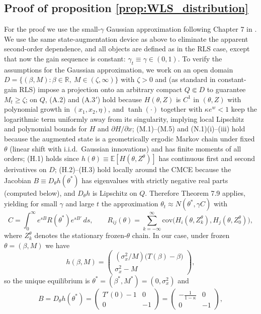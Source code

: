 \documentclass[11pt]{article}
\begin{document}
\subsection{Proof of proposition \ref{prop:WLS_distribution}}\label{app:proofs_WLS}
For the proof we use the small-$\gamma$ Gaussian approximation following Chapter 7 in \cite{GeorgeWEvans2001}.
We use the same state-augmentation device as above to eliminate the apparent second-order dependence, and all objects are defined as in the RLS case, except that now the gain sequence is constant: $\gamma_t\equiv \gamma\in(0,1)$.
To verify the assumptions for the Gaussian approximation, we work on an open domain $D=\{(\beta,M):\beta\in\mathbb R,\ M\in(\zeta,\infty)\}$ with $\zeta>0$ and (as standard in constant-gain RLS) impose a projection onto an arbitrary compact $Q\Subset D$ to guarantee $M_t\ge\zeta$; on $Q$, (A.2) and (A.3$'$) hold because $H(\theta,Z)$ is $C^1$ in $(\theta,Z)$ with polynomial growth in $(x_1,x_2,\eta)$, and $\tanh(\cdot)$ together with $\kappa e^{w}<1$ keep the logarithmic term uniformly away from its singularity, implying local Lipschitz and polynomial bounds for $H$ and $\partial H/\partial x$; (M.1)–(M.5) and (N.1)(i)–(iii) hold because the augmented state is a geometrically ergodic Markov chain under fixed $\theta$ (linear shift with i.i.d.\ Gaussian innovations) and has finite moments of all orders; (H.1) holds since $h(\theta)\equiv \mathbb E[H(\theta,Z^\theta)]$ has continuous first and second derivatives on $D$; (H.2)–(H.3) hold locally around the CMCE because the Jacobian $B\equiv D_\theta h(\theta^*)$ has eigenvalues with strictly negative real parts (computed below), and $D_\theta h$ is Lipschitz on $Q$. Therefore Theorem 7.9 applies, yielding for small $\gamma$ and large $t$ the approximation $\theta_t\approx N(\theta^*,\gamma C)$ with
\[
C=\int_0^\infty e^{sB}R(\theta^*)e^{sB'}\,ds,
\qquad
R_{ij}(\theta)=\sum_{k=-\infty}^{\infty}\mathrm{cov}\!\big(H_i(\theta,Z^\theta_k),H_j(\theta,Z^\theta_0)\big),
\]
where $Z_k^\theta$ denotes the stationary frozen-$\theta$ chain. 
In our case, under frozen $\theta=(\beta,M)$ we have
\[
h(\beta,M)=
\begin{pmatrix}
(\sigma_x^2/M)\big(T(\beta)-\beta\big)\\
\sigma_x^2-M
\end{pmatrix},
\]
so the unique equilibrium is $\theta^*=(\beta^*,M^*)=(0,\sigma_x^2)$ and
\[
B=D_\theta h(\theta^*)=
\begin{pmatrix}
T'(0)-1 & 0\\
0 & -1
\end{pmatrix}
=
\begin{pmatrix}
-\frac{1}{1-\kappa} & 0\\
0 & -1
\end{pmatrix},
\]
\end{document}

